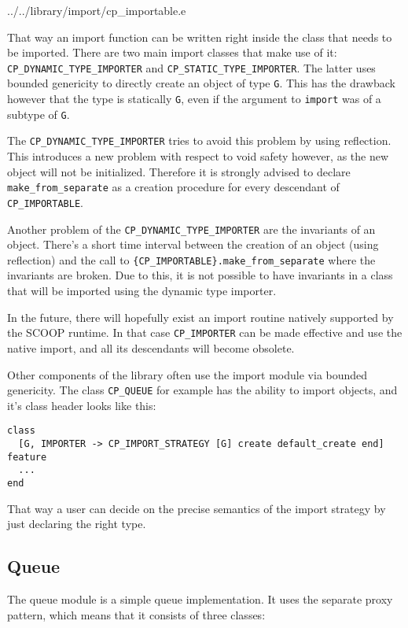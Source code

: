 \documentclass[a4paper,10pt]{report}
\begin{document}
 {../../library/import/cp_importable.e}

That way an import function can be written right inside the class that needs to be imported.
There are two main import classes that make use of it: \lstinline!CP_DYNAMIC_TYPE_IMPORTER! and \lstinline!CP_STATIC_TYPE_IMPORTER!.
The latter uses bounded genericity to directly create an object of type \lstinline!G!.
This has the drawback however that the type is statically \lstinline!G!, even if the argument to \lstinline!import! was of a subtype of \lstinline!G!.

The \lstinline!CP_DYNAMIC_TYPE_IMPORTER! tries to avoid this problem by using reflection.
This introduces a new problem with respect to void safety however, as the new object will not be initialized.
Therefore it is strongly advised to declare \lstinline!make_from_separate! as a creation procedure for every descendant of \lstinline!CP_IMPORTABLE!.

Another problem of the \lstinline!CP_DYNAMIC_TYPE_IMPORTER! are the invariants of an object.
There's a short time interval between the creation of an object (using reflection) and the call to \lstinline!{CP_IMPORTABLE}.make_from_separate! where the invariants are broken.
Due to this, it is not possible to have invariants in a class that will be imported using the dynamic type importer.

In the future, there will hopefully exist an import routine natively supported by the SCOOP runtime.
In that case \lstinline!CP_IMPORTER! can be made effective and use the native import, and all its descendants will become obsolete.


Other components of the library often use the import module via bounded genericity.
The class \lstinline!CP_QUEUE! for example has the ability to import objects, and it's class header looks like this:
\begin{lstlisting}
class
  [G, IMPORTER -> CP_IMPORT_STRATEGY [G] create default_create end]
feature
  ...
end
\end{lstlisting}
That way a user can decide on the precise semantics of the import strategy by just declaring the right type.
 
\subsection{Queue}

The queue module is a simple queue implementation.
It uses the separate proxy pattern, which means that it consists of three classes:
\end{document}

